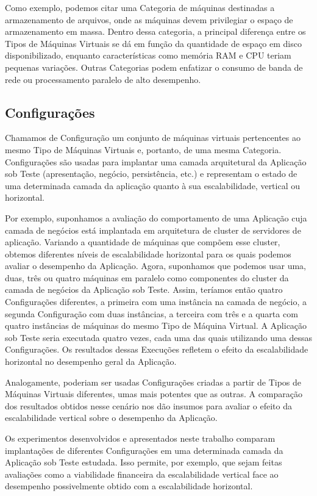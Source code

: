 Como exemplo, podemos citar uma Categoria de máquinas destinadas a armazenamento 
de arquivos, onde as máquinas devem privilegiar o espaço de armazenamento em 
massa. Dentro dessa categoria, a principal diferença entre os Tipos de Máquinas 
Virtuais se dá em função da quantidade de espaço em disco disponibilizado, 
enquanto características como memória RAM e CPU teriam pequenas variações. 
Outras Categorias podem enfatizar o consumo de banda de rede ou processamento 
paralelo de alto desempenho.

\subsection{Configurações}
Chamamos de Configuração um conjunto de máquinas virtuais pertencentes ao mesmo 
Tipo de Máquinas Virtuais e, portanto, de uma mesma Categoria. Configurações são
usadas para implantar uma camada arquitetural da Aplicação sob Teste (apresentação, 
negócio, persistência, etc.) e representam o estado de uma determinada camada da 
aplicação quanto à sua escalabilidade, vertical ou horizontal.

Por exemplo, suponhamos a avaliação do comportamento de uma Aplicação cuja camada de
negócios está implantada em arquitetura de cluster de servidores de aplicação. 
Variando a quantidade de máquinas que compõem esse cluster, obtemos diferentes níveis
de escalabilidade horizontal para os quais podemos avaliar o desempenho da Aplicação.
Agora, suponhamos que podemos usar uma, duas, três ou quatro máquinas em paralelo como
componentes do cluster da camada de negócios da Aplicação sob Teste. Assim, teríamos
então quatro Configurações diferentes, a primeira com uma instância na camada de negócio,
a segunda Configuração com duas instâncias, a terceira com três e a quarta com quatro 
instâncias de máquinas do mesmo Tipo de Máquina Virtual. A Aplicação sob Teste seria 
executada quatro vezes, cada uma das quais utilizando uma dessas Configurações. Os 
resultados dessas Execuções refletem o efeito da escalabilidade horizontal no desempenho
geral da Aplicação.

Analogamente, poderiam ser usadas Configurações criadas a partir de Tipos de Máquinas
Virtuais diferentes, umas mais potentes que as outras. A comparação dos resultados obtidos
nesse cenário nos dão insumos para avaliar o efeito da escalabilidade vertical sobre o
desempenho da Aplicação.

Os experimentos desenvolvidos e apresentados neste trabalho comparam 
implantações de diferentes Configurações em uma determinada camada da Aplicação 
sob Teste estudada. Isso permite, por exemplo, que sejam feitas avaliações como 
a viabilidade financeira da escalabilidade vertical face ao desempenho 
possivelmente obtido com a escalabilidade horizontal.

